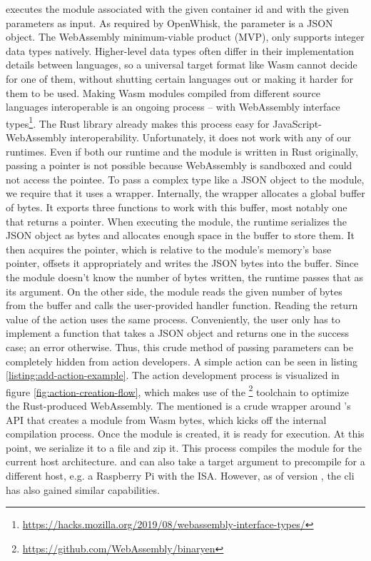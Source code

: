  executes the module associated with the given container id and with the given parameters as input. As required by OpenWhisk, the parameter is a JSON object. The WebAssembly minimum-viable product (MVP), only supports integer data types natively. Higher-level data types often differ in their implementation details between languages, so a universal target format like Wasm cannot decide for one of them, without shutting certain languages out or making it harder for them to be used. Making Wasm modules compiled from different source languages interoperable is an ongoing process -- with WebAssembly interface types\footnote{\url{https://hacks.mozilla.org/2019/08/webassembly-interface-types/}}. The  Rust library already makes this process easy for JavaScript-WebAssembly interoperability. Unfortunately, it does not work with any of our runtimes. Even if both our runtime and the module is written in Rust originally, passing a pointer is not possible because WebAssembly is sandboxed and could not access the pointee. To pass a complex type like a JSON object to the module, we require that it uses a wrapper. Internally, the wrapper allocates a global buffer of bytes. It exports three functions to work with this buffer, most notably one that returns a pointer. When executing the module, the runtime serializes the JSON object as bytes and allocates enough space in the buffer to store them. It then acquires the pointer, which is relative to the module's memory's base pointer, offsets it appropriately and writes the JSON bytes into the buffer. Since the module doesn't know the number of bytes written, the runtime passes that as its argument. On the other side, the module reads the given number of bytes from the buffer and calls the user-provided handler function. Reading the return value of the action uses the same process. Conveniently, the user only has to implement a function that takes a JSON object and returns one in the success case; an error otherwise. Thus, this crude method of passing parameters can be completely hidden from action developers. A simple action can be seen in listing \ref{listing:add-action-example}. The action development process is visualized in figure \ref{fig:action-creation-flow}, which makes use of the \footnote{\url{https://github.com/WebAssembly/binaryen}} toolchain to optimize the Rust-produced WebAssembly.
The mentioned  is a crude wrapper around 's API that creates a module from Wasm bytes, which kicks off the internal compilation process. Once the module is created, it is ready for execution. At this point, we serialize it to a file and zip it. This process compiles the module for the current host architecture.  and  can also take a target argument to precompile for a different host, e.g. a Raspberry Pi with the  ISA. However, as of version , the  cli has also gained similar capabilities.
